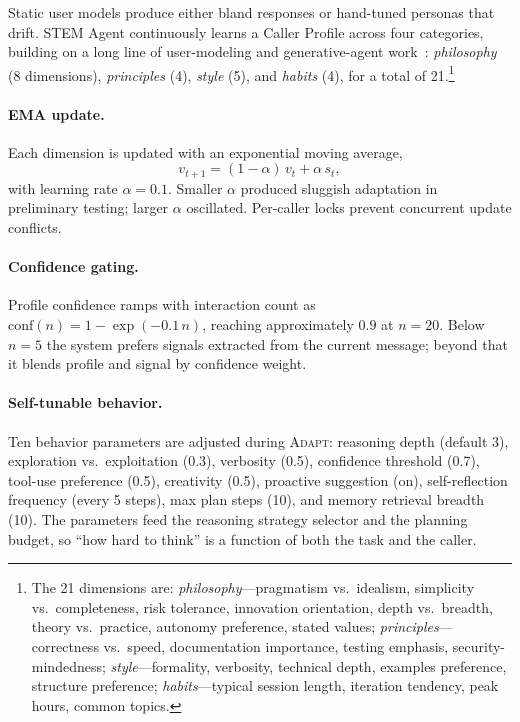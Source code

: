 \documentclass[11pt]{article}
\begin{document}
Static user models produce either bland responses or hand-tuned personas that drift. STEM Agent continuously learns a Caller Profile across four categories, building on a long line of user-modeling and generative-agent work~\citep{park2023generative}: \emph{philosophy} (8 dimensions), \emph{principles} (4), \emph{style} (5), and \emph{habits} (4), for a total of 21.\footnote{The 21 dimensions are: \textit{philosophy}---pragmatism vs.\ idealism, simplicity vs.\ completeness, risk tolerance, innovation orientation, depth vs.\ breadth, theory vs.\ practice, autonomy preference, stated values; \textit{principles}---correctness vs.\ speed, documentation importance, testing emphasis, security-mindedness; \textit{style}---formality, verbosity, technical depth, examples preference, structure preference; \textit{habits}---typical session length, iteration tendency, peak hours, common topics.}

\paragraph{EMA update.} Each dimension is updated with an exponential moving average,
\begin{equation}
v_{t+1} = (1-\alpha)\,v_t + \alpha\,s_t,
\label{eq:ema}
\end{equation}
with learning rate $\alpha=0.1$. Smaller $\alpha$ produced sluggish adaptation in preliminary testing; larger $\alpha$ oscillated. Per-caller locks prevent concurrent update conflicts.

\paragraph{Confidence gating.} Profile confidence ramps with interaction count as
$\text{conf}(n) = 1 - \exp(-0.1\,n)$,
reaching approximately $0.9$ at $n{=}20$. Below $n{=}5$ the system prefers signals extracted from the current message; beyond that it blends profile and signal by confidence weight.

\paragraph{Self-tunable behavior.} Ten behavior parameters are adjusted during \textsc{Adapt}: reasoning depth (default 3), exploration vs.\ exploitation (0.3), verbosity (0.5), confidence threshold (0.7), tool-use preference (0.5), creativity (0.5), proactive suggestion (on), self-reflection frequency (every 5 steps), max plan steps (10), and memory retrieval breadth (10). The parameters feed the reasoning strategy selector and the planning budget, so ``how hard to think'' is a function of both the task and the caller.
\end{document}
